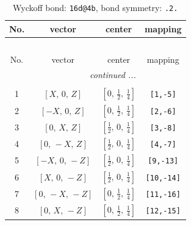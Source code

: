 \documentclass[fleqn,8pt]{jsarticle}
\begin{document}
\begin{longtable}{cccc}
\caption{Wyckoff bond: {\tt 16d@4b}, bond symmetry: {\tt .2.}}
 \\
 \hline \hline
No. & vector & center & mapping \\ \hline \endfirsthead

\multicolumn{3}{l}{\tablename\ \thetable{}} \\
 \hline \hline
No. & vector & center & mapping \\ \hline \endhead

 \hline \hline
\multicolumn{3}{r}{\footnotesize\it continued ...} \\ \endfoot

 \hline \hline
\multicolumn{3}{r}{} \\ \endlastfoot

1 & $\left[ X,\, 0,\, Z \right]$ & $\left[ 0,\, \frac{1}{2},\, \frac{1}{4} \right]$ & {\tt [1,-5]} \\ \hline
2 & $\left[ - X,\, 0,\, Z \right]$ & $\left[ 0,\, \frac{1}{2},\, \frac{1}{4} \right]$ & {\tt [2,-6]} \\ \hline
3 & $\left[ 0,\, X,\, Z \right]$ & $\left[ \frac{1}{2},\, 0,\, \frac{1}{4} \right]$ & {\tt [3,-8]} \\ \hline
4 & $\left[ 0,\, - X,\, Z \right]$ & $\left[ \frac{1}{2},\, 0,\, \frac{1}{4} \right]$ & {\tt [4,-7]} \\ \hline
5 & $\left[ - X,\, 0,\, - Z \right]$ & $\left[ \frac{1}{2},\, 0,\, \frac{1}{4} \right]$ & {\tt [9,-13]} \\ \hline
6 & $\left[ X,\, 0,\, - Z \right]$ & $\left[ \frac{1}{2},\, 0,\, \frac{1}{4} \right]$ & {\tt [10,-14]} \\ \hline
7 & $\left[ 0,\, - X,\, - Z \right]$ & $\left[ 0,\, \frac{1}{2},\, \frac{1}{4} \right]$ & {\tt [11,-16]} \\ \hline
8 & $\left[ 0,\, X,\, - Z \right]$ & $\left[ 0,\, \frac{1}{2},\, \frac{1}{4} \right]$ & {\tt [12,-15]} \\
\end{longtable}
\renewcommand{\arraystretch}{1.2}
\end{document}

